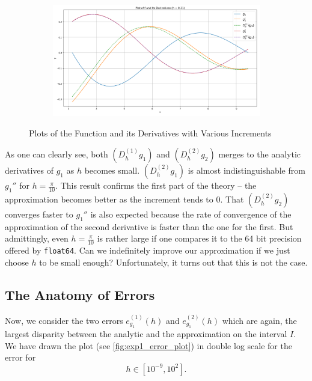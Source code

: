 \begin{figure}[h!]
\begin{subfigure}[b]{0.49\linewidth}
    \end{subfigure}
    \begin{subfigure}[b]{0.49\linewidth}
        \includegraphics[width=\linewidth]{graphics/plot_h/exp1_tiny_h.png}
    \end{subfigure}
    \caption{Plots of the Function and its Derivatives with Various Increments}
    \label{fig:exp1_h}
\end{figure}

As one can clearly see, both \((D^{(1)}_h g_1)\) and \((D^{(2)}_hg_2)\) merges to the analytic derivatives of \(g_1\) as \(h\) becomes small. \((D^{(2)}_h g_1)\) is almost indistinguishable from \(g_1''\) for \(h = \frac{\pi}{10}\). This result confirms the first part of the theory -- the approximation becomes better as the increment tends to \(0\). That \((D^{(2)}_h g_2)\) converges faster to \(g_1''\) is also expected because the rate of convergence of the approximation of the second derivative is faster than the one for the first. But admittingly, even \(h = \frac{\pi}{10}\) is rather large if one compares it to the 64 bit precision offered by \texttt{float64}. Can we indefinitely improve our approximation if we just choose \(h\) to be small enough? Unfortunately, it turns out that this is not the case.

\subsection{The Anatomy of Errors}

Now, we consider the two errors \(e_{g_1}^{(1)}(h)\) and \(e_{g_1}^{(2)}(h)\) which are again, the largest disparity between the analytic and the approximation on the interval \(I\). We have drawn the plot (see \ref{fig:exp1_error_plot}) in double log scale for the error for
\[h \in [10^{-9}, 10^2] \text{.} \]

